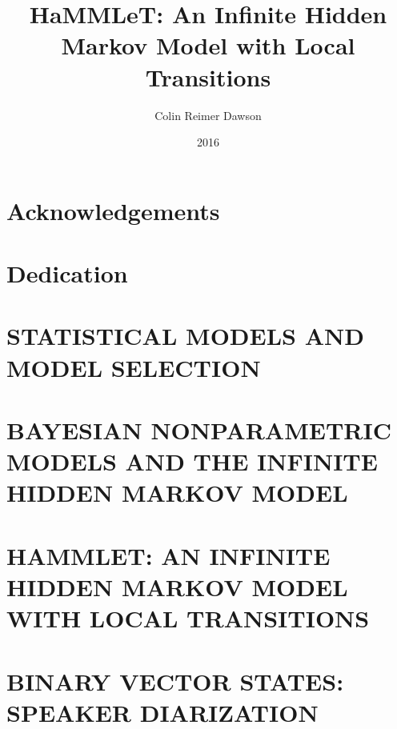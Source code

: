 \documentclass[final]{ua-thesis}
\title{{HaMMLeT}: An Infinite Hidden Markov Model with Local
  Transitions}
\author{Colin Reimer Dawson}
\date{2016}
\begin{document}
% 
\maketitle



\chapter*{Acknowledgements}
\begin{singlespace}

\end{singlespace}

\chapter*{Dedication}


\tableofcontents
\listoftables
\listoffigures
\begin{abstract}

\end{abstract}

\chapter{ \MakeUppercase{Statistical Models and Model Selection} }
\label{chapter:intro}



\chapter{ \MakeUppercase{Bayesian Nonparametric Models and the Infinite
  Hidden Markov Model} }
\label{chapter:HMM-NPBayes}


\chapter{\MakeUppercase{HaMMLeT: An Infinite Hidden Markov Model with
    Local Transitions}}
\label{chapter:HaMMLeT}


\chapter{\MakeUppercase{Binary Vector States: Speaker Diarization}}
\label{chapter:cocktail-party}



\end{document}
